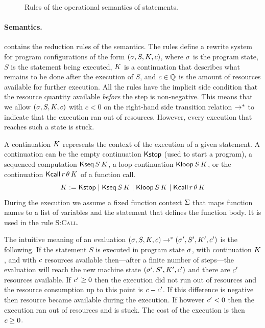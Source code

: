 \documentclass[nocopyrightspace,preprint,pldi]{sigplanconf-pldi15}
\newcommand{\pref}[1]{\prettyref{#1}}
\begin{document}
{\begin{figure}[t!]
\begin{mathpar}
\end{mathpar}
\caption{Rules of the operational semantics of statements.}
\label{fig:opsem}
\end{figure}


\paragraph{Semantics.}

\pref{fig:opsem} contains the reduction rules of the semantics.  The rules
define a rewrite system for program configurations of the form $(\state,
S, \cont, \cost)$, where $\state$ is the program state, $S$ is the
statement being executed, $\cont$ is a continuation that describes what
remains to be done after the execution of $S$, and $\cost \in \Q$ is
the amount of resources available for further execution.  All the rules
have the implicit side condition that the resource quantity available
\emph{before} the step is non-negative.  This means that we allow
$(\state, S, \cont, \cost)$ with $c<0$ on the right-hand side transition
relation $\smallstep^*$ to indicate that the execution ran out of
resources.  However, every execution that reaches such a state is stuck.

A continuation $\cont$ represents the context of the execution of a
given statement.  A continuation can be the empty continuation
$\Kstop$ (used to start a program), a sequenced computation $\Kseq S
\cont$, a loop continuation $\Kloop S \cont$, or the continuation
$\Kcall r \theta \cont$ of a function call.
$$
\cont := \Kstop
\mid \Kseq S \cont
\mid \Kloop S \cont
\mid \Kcall r \theta \cont
$$
%
During the execution we assume a fixed function context $\fenv$ that
maps function names to a list of variables and the statement that
defines the function body.  It is used in the rule \textsc{S:Call}.

The intuitive meaning of an evaluation $(\state,
S, \cont, \cost) \smallstep^* (\state', S', \cont', \cost')$ is the
following.  If the statement $S$ is executed in program state
$\state$, with continuation $\cont$, and with $\cost$ resources
available then---after a finite number of steps---the evaluation will
reach the new machine state $(\state', S', \cont',\cost')$ and there
are $\cost'$ resources available.  If $\cost' \ge 0$ then the
execution did not run out of resources and the resource consumption up
to this point is $\cost - \cost'$.  If this difference is negative
then resource became available during the execution.  If however
$\cost' < 0$ then the execution ran out of resources and is stuck.
The cost of the execution is then $\cost \ge 0$.

}
\end{document}
